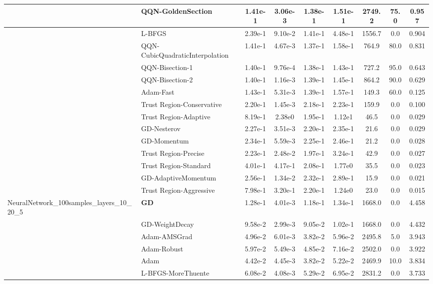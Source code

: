 \documentclass{article}
\begin{document}
\begin{longtable}{|l|l|c|c|c|c|c|c|c|}
\hline
 & QQN-GoldenSection & 1.41e-1 & 3.06e-3 & 1.38e-1 & 1.51e-1 & 2749.2 & 75.0 & 0.957 \\
\hline
 & L-BFGS & 2.39e-1 & 9.10e-2 & 1.41e-1 & 4.48e-1 & 1556.7 & 0.0 & 0.904 \\
\hline
 & QQN-CubicQuadraticInterpolation & 1.41e-1 & 4.67e-3 & 1.37e-1 & 1.58e-1 & 764.9 & 80.0 & 0.831 \\
\hline
 & QQN-Bisection-1 & 1.40e-1 & 9.76e-4 & 1.38e-1 & 1.43e-1 & 727.2 & 95.0 & 0.643 \\
\hline
 & QQN-Bisection-2 & 1.40e-1 & 1.16e-3 & 1.39e-1 & 1.45e-1 & 864.2 & 90.0 & 0.629 \\
\hline
 & Adam-Fast & 1.43e-1 & 5.31e-3 & 1.39e-1 & 1.57e-1 & 149.3 & 60.0 & 0.125 \\
\hline
 & Trust Region-Conservative & 2.20e-1 & 1.45e-3 & 2.18e-1 & 2.23e-1 & 159.9 & 0.0 & 0.100 \\
\hline
 & Trust Region-Adaptive & 8.19e-1 & 2.38e0 & 1.95e-1 & 1.12e1 & 46.5 & 0.0 & 0.029 \\
\hline
 & GD-Nesterov & 2.27e-1 & 3.51e-3 & 2.20e-1 & 2.35e-1 & 21.6 & 0.0 & 0.029 \\
\hline
 & GD-Momentum & 2.34e-1 & 5.59e-3 & 2.25e-1 & 2.46e-1 & 21.2 & 0.0 & 0.028 \\
\hline
 & Trust Region-Precise & 2.23e-1 & 2.48e-2 & 1.97e-1 & 3.24e-1 & 42.9 & 0.0 & 0.027 \\
\hline
 & Trust Region-Standard & 4.01e-1 & 4.17e-1 & 2.08e-1 & 1.77e0 & 35.5 & 0.0 & 0.023 \\
\hline
 & GD-AdaptiveMomentum & 2.56e-1 & 1.34e-2 & 2.32e-1 & 2.89e-1 & 15.9 & 0.0 & 0.021 \\
\hline
 & Trust Region-Aggressive & 7.98e-1 & 3.20e-1 & 2.20e-1 & 1.24e0 & 23.0 & 0.0 & 0.015 \\
NeuralNetwork\_100samples\_layers\_10\_20\_5 & \textbf{GD} & 1.28e-1 & 4.01e-3 & 1.18e-1 & 1.34e-1 & 1668.0 & 0.0 & 4.458 \\
\hline
 & GD-WeightDecay & 9.58e-2 & 2.99e-3 & 9.05e-2 & 1.02e-1 & 1668.0 & 0.0 & 4.432 \\
\hline
 & Adam-AMSGrad & 4.96e-2 & 6.01e-3 & 3.82e-2 & 5.96e-2 & 2495.8 & 5.0 & 3.943 \\
\hline
 & Adam-Robust & 5.97e-2 & 5.49e-3 & 4.85e-2 & 7.16e-2 & 2502.0 & 0.0 & 3.922 \\
\hline
 & Adam & 4.42e-2 & 4.45e-3 & 3.82e-2 & 5.22e-2 & 2469.9 & 10.0 & 3.834 \\
\hline
 & L-BFGS-MoreThuente & 6.08e-2 & 4.08e-3 & 5.29e-2 & 6.95e-2 & 2831.2 & 0.0 & 3.733 \\

\end{longtable}
\end{document}
